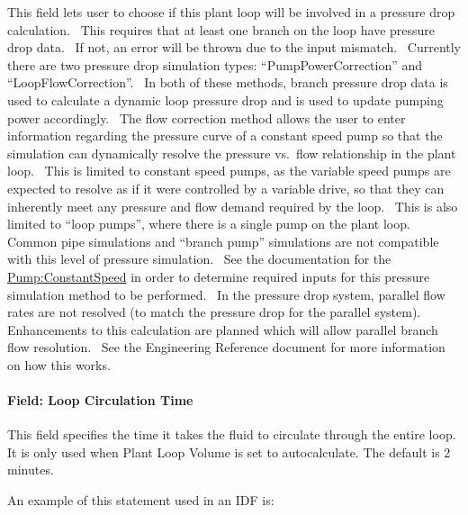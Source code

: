 This field lets user to choose if this plant loop will be involved in a pressure drop calculation.~ This requires that at least one branch on the loop have pressure drop data.~ If not, an error will be thrown due to the input mismatch.~ Currently there are two pressure drop simulation types: ``PumpPowerCorrection'' and ``LoopFlowCorrection''.~ In both of these methods, branch pressure drop data is used to calculate a dynamic loop pressure drop and is used to update pumping power accordingly.~ The flow correction method allows the user to enter information regarding the pressure curve of a constant speed pump so that the simulation can dynamically resolve the pressure vs.~flow relationship in the plant loop.~ This is limited to constant speed pumps, as the variable speed pumps are expected to resolve as if it were controlled by a variable drive, so that they can inherently meet any pressure and flow demand required by the loop.~ This is also limited to ``loop pumps'', where there is a single pump on the plant loop. Common pipe simulations and ``branch pump'' simulations are not compatible with this level of pressure simulation.~ See the documentation for the \hyperref[pumpconstantspeed]{Pump:ConstantSpeed} in order to determine required inputs for this pressure simulation method to be performed.~ In the pressure drop system, parallel flow rates are not resolved (to match the pressure drop for the parallel system).~ Enhancements to this calculation are planned which will allow parallel branch flow resolution.~ See the Engineering Reference document for more information on how this works.

\paragraph{Field: Loop Circulation Time}\label{plantloop-field-loop-circulation-time}

This field specifies the time it takes the fluid to circulate through the entire loop. It is only used when Plant Loop Volume is set to autocalculate. The default is 2 minutes.

An example of this statement used in an IDF is:

